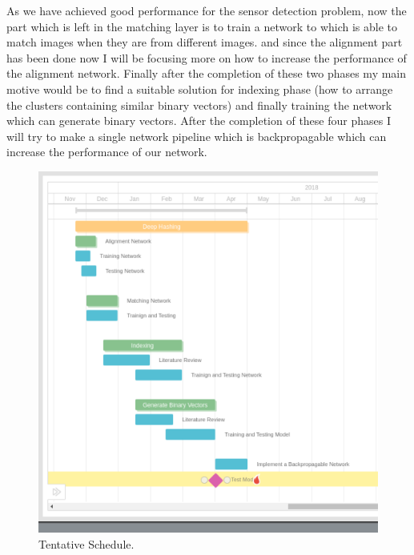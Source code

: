 \documentclass[12pt, a4paper,twoside]{article}
\begin{document}
\label{sec:Tentative Plan}
	As we have achieved good performance for the sensor detection problem, now the part which is left in the matching layer is to train a network to which is able to match images when they are from  different images.
	and since the alignment part has been done now I will be focusing more on how to increase the performance of the alignment network. Finally after the completion of these two phases my main motive would be to find a suitable solution for indexing phase (how to arrange the clusters containing similar binary vectors) and finally training the network which can generate binary vectors. After the completion of these four phases I will try to make a single network pipeline which is backpropagable which can increase the performance of our network.

\begin{figure}[htbp]
\centering
\includegraphics[scale=1]{images/GantChart}
\caption{ Tentative Schedule.
}\label{fig:figure9}
\end{figure} 
\end{document}

